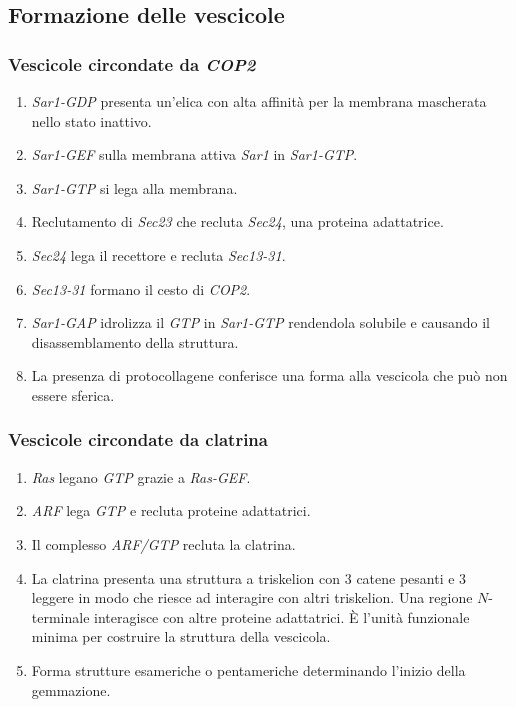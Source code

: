 	\subsection{Formazione delle vescicole}
	
		\subsubsection{Vescicole circondate da \emph{COP2}}
		\begin{multicols}{2}
			\begin{enumerate}
				\item \emph{Sar1-GDP} presenta un'elica con alta affinit\`a per la membrana mascherata nello stato inattivo.
				\item \emph{Sar1-GEF} sulla membrana attiva \emph{Sar1} in \emph{Sar1-GTP}.
				\item \emph{Sar1-GTP} si lega alla membrana.
				\item Reclutamento di \emph{Sec23} che recluta \emph{Sec24}, una proteina adattatrice.
				\item \emph{Sec24} lega il recettore e recluta \emph{Sec13-31}.
				\item \emph{Sec13-31} formano il cesto di \emph{COP2}.
				\item \emph{Sar1-GAP} idrolizza il \emph{GTP} in \emph{Sar1-GTP} rendendola solubile e causando il disassemblamento della struttura.
				\item La presenza di protocollagene conferisce una forma alla vescicola che pu\`o non essere sferica.
			\end{enumerate}
		\end{multicols}

		\subsubsection{Vescicole circondate da clatrina}
		\begin{multicols}{2}
			\begin{enumerate}
				\item \emph{Ras} legano \emph{GTP} grazie a \emph{Ras-GEF}.
				\item \emph{ARF} lega \emph{GTP} e recluta proteine adattatrici.
				\item Il complesso \emph{ARF/GTP} recluta la clatrina.
				\item La clatrina presenta una struttura a triskelion con $3$ catene pesanti e $3$ leggere in modo che riesce ad interagire con altri triskelion.
					Una regione $N$-terminale interagisce con altre proteine adattatrici.
					\`E l'unit\`a funzionale minima per costruire la struttura della vescicola.
				\item Forma strutture esameriche o pentameriche determinando l'inizio della gemmazione.
			\end{enumerate}
		\end{multicols}

